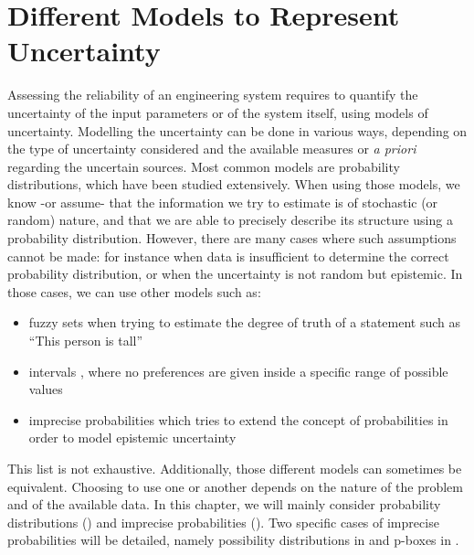 \section{Different Models to Represent Uncertainty}\label{sec:different_models_of_uncertainty}
Assessing the reliability of an engineering system requires to quantify the uncertainty of the input parameters or of the system itself, using models of uncertainty. Modelling the uncertainty can be done in various ways, depending on the type of uncertainty considered and the available measures or \textit{a priori} regarding the uncertain sources. Most common models are probability distributions, which have been studied extensively. When using those models, we know -or assume- that the information we try to estimate is of stochastic (or random) nature, and that we are able to precisely describe its structure using a probability distribution. However, there are many cases where such assumptions cannot be made: for instance when data is insufficient to determine the correct probability distribution, or when the uncertainty is not random but epistemic. In those cases, we can use other models such as:
\begin{itemize}
    \item fuzzy sets \cite{zadeh_fuzzy_1999} when trying to estimate the degree of truth of a statement such as ``This person is tall''
    \item intervals \cite{jaulin_applied_2001}, where no preferences are given inside a specific range of possible values
    \item imprecise probabilities which tries to extend the concept of probabilities in order to model epistemic uncertainty 
\end{itemize}
This list is not exhaustive. Additionally, those different models can sometimes be equivalent. Choosing to use one or another depends on the nature of the problem and of the available data. In this chapter, we will mainly consider probability distributions () and imprecise probabilities (). Two specific cases of imprecise probabilities will be detailed, namely possibility distributions in  and p-boxes in .

